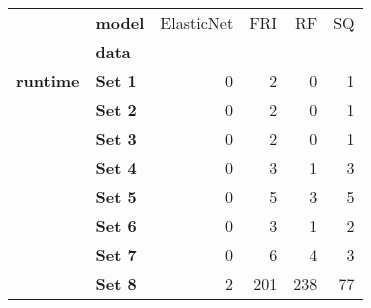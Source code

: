 \begin{tabular}{llrrrr}
\toprule
        & \textbf{model} &  ElasticNet &  FRI &   RF &  SQ \\
{} & \textbf{data} &             &      &      &     \\
\midrule
\textbf{runtime} & \textbf{Set 1} &           0 &    2 &    0 &   1 \\
        & \textbf{Set 2} &           0 &    2 &    0 &   1 \\
        & \textbf{Set 3} &           0 &    2 &    0 &   1 \\
        & \textbf{Set 4} &           0 &    3 &    1 &   3 \\
        & \textbf{Set 5} &           0 &    5 &    3 &   5 \\
        & \textbf{Set 6} &           0 &    3 &    1 &   2 \\
        & \textbf{Set 7} &           0 &    6 &    4 &   3 \\
        & \textbf{Set 8} &           2 &  201 &  238 &  77 \\
\bottomrule
\end{tabular}
